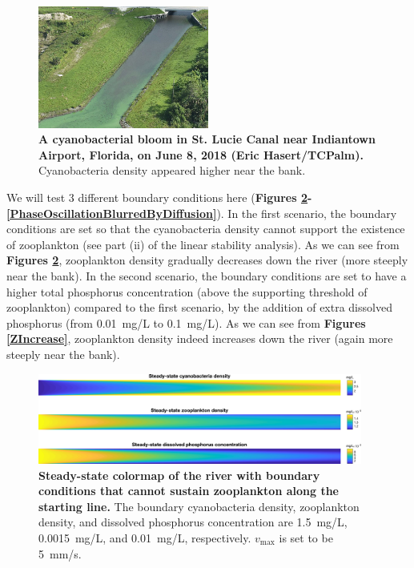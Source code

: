 \documentclass{article}
\begin{document}
\begin{figure}[h]
    \centering
    \includegraphics[width=0.5\textwidth]{StLucieCanal.jpg}
    \caption{\textbf{A cyanobacterial bloom in St. Lucie Canal near Indiantown Airport, Florida, on June 8, 2018 (Eric Hasert/TCPalm).} Cyanobacteria density appeared higher near the bank.}
    \label{StLucieCanal}
\end{figure}

We will test 3 different boundary conditions here (\textbf{Figures \ref{CannotSupportPredator}-\ref{PhaseOscillationBlurredByDiffusion}}). In the first scenario, the boundary conditions are set so that the cyanobacteria density cannot support the existence of zooplankton (see part (ii) of the linear stability analysis). As we can see from \textbf{Figures \ref{CannotSupportPredator}}, zooplankton density gradually decreases down the river (more steeply near the bank). In the second scenario, the boundary conditions are set to have a higher total phosphorus concentration (above the supporting threshold of zooplankton) compared to the first scenario, by the addition of extra dissolved phosphorus (from \SI{0.01}{mg/L} to \SI{0.1}{mg/L}). As we can see from \textbf{Figures \ref{ZIncrease}}, zooplankton density indeed increases down the river (again more steeply near the bank).

\begin{figure}[H]
    \centering
    \includegraphics[width=0.95\textwidth]{PreyCannotSupportPredator.pdf}
    \caption{\textbf{Steady-state colormap of the river with boundary conditions that cannot sustain zooplankton along the starting line.} The boundary cyanobacteria density, zooplankton density, and dissolved phosphorus concentration are \SI{1.5}{mg/L}, \SI{0.0015}{mg/L}, and \SI{0.01}{mg/L}, respectively. $v_{\max}$ is set to be \SI{5}{mm/s}.}
    \label{CannotSupportPredator}
\end{figure}
\end{document}
